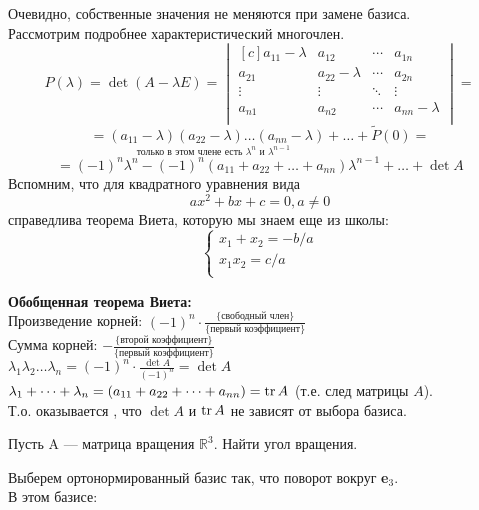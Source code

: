 Очевидно, собственные значения не меняются при замене базиса.\\

Рассмотрим подробнее характеристический многочлен.
$$
P(\lambda)=\det (A-\lambda E)=
\begin{vmatrix*}[c]
 a_{11}-\lambda & a_{12} & \cdots & a_{1n}\\
 a_{21} & a_{22}-\lambda & \cdots & a_{2n}\\
 \vdots & \vdots & \ddots & \vdots \\
 a_{n1} & a_{n2} & \cdots & a_{nn}-\lambda\\
\end{vmatrix*}
=
$$
$$
=\underset{\text{только в этом члене есть $\lambda^{n}$ и $\lambda^{n-1}$ }}
{( a_{11}-\lambda)(a_{22}-\lambda)\dots ( a_{nn}-\lambda)} + \dots + \tilde P(0)=
$$
$$
=(-1)^{n}\lambda^{n}-(-1)^{n}( a_{11}+a_{22}+\dots+a_{nn})\lambda^{n-1}+\dots+\det A
$$
Вспомним, что для квадратного уравнения вида 
$$ax^{2}+bx+c=0, a\neq 0$$
справедлива теорема Виета, которую мы знаем еще из школы:
$$\left\{
\begin{aligned}
x_{1}+x_{2}=-b/a\\
x_{1}x_{2}=c/a\\
\end{aligned}
\right.$$

\textbf{Обобщенная теорема Виета:}\\
Произведение корней: $(-1)^{n}\cdot \frac{\{ \text{свободный член}\}}{\{ \text{первый коэффициент}\}}$\\
Сумма корней: $-\frac{\{ \text{второй коэффициент}\}}{\{ \text{первый коэффициент}\}}$\\
$\lambda_{1}\lambda_{2}\dots \lambda_{n}=(-1)^{n}\cdot \frac{\det A}{(-1)^{n}}=\det A$\\
$\lambda_{1}+ \dots + \lambda_{n}=(a_{11}+a_{22}+\dots+a_{nn})=\operatorname{\mathop{tr}} A$ (т.е. след матрицы $A$).\\
Т.о. оказывается , что $\det A$ и $\operatorname{\mathop{tr}} A$ не зависят от выбора базиса.
\begin{prim}
Пусть A --- матрица вращения $\mathbb{R}^{3}$. Найти угол вращения.
\end{prim}
Выберем ортонормированный базис так, что поворот вокруг \textbf{e$_{3}$}.\\
В этом базисе: